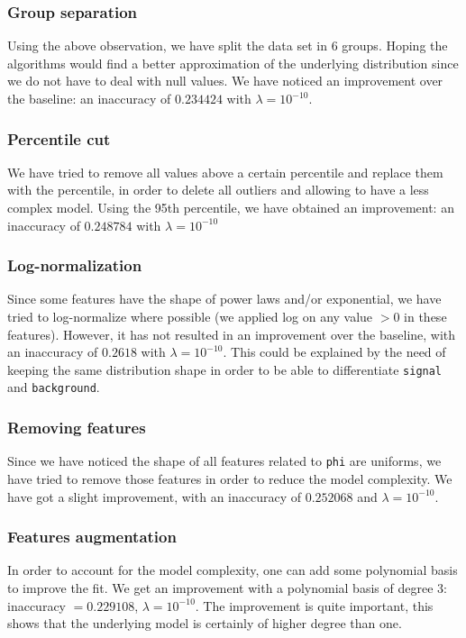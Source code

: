 \documentclass[10pt,conference,compsocconf]{IEEEtran}
\begin{document}
\subsubsection{Group separation}
Using the above observation, we have split the data set in $6$ groups. Hoping
the algorithms would find a better approximation of the underlying distribution
since we do not have to deal with null values. We have noticed an
improvement over the baseline: an inaccuracy of $0.234424$ with $\lambda =
10^{-10}$.

\subsubsection{Percentile cut}
We have tried to remove all values above a certain percentile and replace them with
the percentile, in order to delete all outliers and allowing to have a less
complex model. Using the 95th percentile, we have obtained an improvement: an
inaccuracy of $0.248784$ with $\lambda = 10^{-10}$

\subsubsection{Log-normalization}
Since some features have the shape of power laws and/or exponential, we have tried to
log-normalize where possible (we applied log on any value $>0$ in these
features). However, it has not resulted in an improvement over the baseline, with
an inaccuracy of $0.2618$ with $\lambda = 10^{-10}$. This could be explained by
the need of keeping the same distribution shape in order to be able to
differentiate \texttt{signal} and \texttt{background}.

\subsubsection{Removing features}
Since we have noticed the shape of all features related to \texttt{phi} are uniforms,
we have tried to remove those features in order to reduce the model complexity. We
have got a slight improvement, with an inaccuracy of $0.252068$ and $\lambda =
10^{-10}$.

\subsubsection{Features augmentation}
In order to account for the model complexity, one can add some polynomial basis
to improve the fit. We get an improvement with a polynomial basis of degree
$3$: inaccuracy $= 0.229108$, $\lambda = 10^{-10}$. The improvement is quite
important, this shows that the underlying model is certainly of higher degree
than one.
\end{document}
